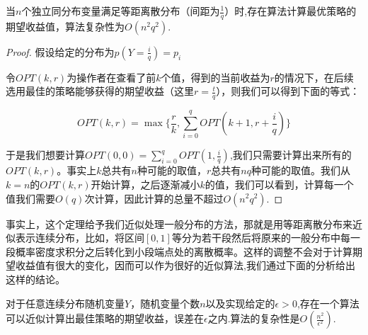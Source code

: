 \documentclass[bachelor]{thuthesis}
\begin{document}
\begin{theorem}

当$n$个独立同分布变量满足等距离散分布（间距为$\frac{1}{q}$）时,存在算法计算最优策略的期望收益值，算法复杂性为$O(n^2q^2)$.

\end{theorem}

\begin{proof}

假设给定的分布为$p(Y=\frac{i}{q})=p_i$

令$OPT(k,r)$为操作者在查看了前$k$个值，得到的当前收益为$r$的情况下，在后续选用最佳的策略能够获得的期望收益（这里$r=\frac{t}{q}$），则我们可以得到下面的等式：

\[OPT(k,r)=\max\{\frac{r}{k},\sum_{i=0}^{q}OPT(k+1,r+\frac{i}{q})\}\]

于是我们想要计算$OPT(0,0)=\sum_{i=0}^{q}OPT(1,\frac{i}{q})$,我们只需要计算出来所有的$OPT(k,r)$。事实上$k$总共有$n$种可能的取值，$r$总共有$nq$种可能的取值。我们从$k=n$的$OPT(k,r)$开始计算，之后逐渐减小$k$的值，我们可以看到，计算每一个值我们需要$O(q)$次计算，因此计算的总量不超过$O(n^2q^2)$.

\end{proof}

事实上，这个定理给予我们近似处理一般分布的方法，那就是用等距离散分布来近似表示连续分布，比如，将区间$[0,1]$等分为若干段然后将原来的一般分布中每一段概率密度求积分之后转化到小段端点处的离散概率。这样的调整不会对于计算期望收益值有很大的变化，因而可以作为很好的近似算法,我们通过下面的分析给出这样的结论。

\begin{theorem}

对于任意连续分布随机变量$Y$，随机变量个数$n$以及实现给定的$\epsilon>0$,存在一个算法可以近似计算出最佳策略的期望收益，误差在$\epsilon$之内.算法的复杂性是$O(\frac{n^2}{\epsilon^2})$.

\end{theorem}
\end{document}
